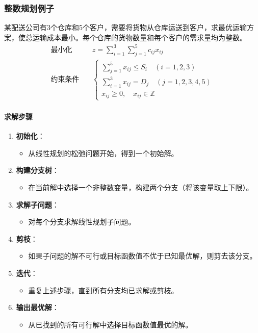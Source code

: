 \documentclass[UTF8]{ctexart}
\begin{document}
\subsubsection {整数规划例子}
某配送公司有3个仓库和5个客户，需要将货物从仓库运送到客户，求最优运输方案，使总运输成本最小。每个仓库的货物数量和每个客户的需求量均为整数。
\[
\begin{aligned}
\text{最小化} & \quad z = \sum_{i=1}^3 \sum_{j=1}^5 c_{ij} x_{ij} \\
\text{约束条件} & \quad 
\begin{cases}
\sum_{j=1}^5 x_{ij} \leq S_i \quad (i=1,2,3) \\
\sum_{i=1}^3 x_{ij} = D_j \quad (j=1,2,3,4,5) \\
x_{ij} \geq 0, \quad x_{ij} \in \mathbb{Z}
\end{cases}
\end{aligned}
\]

\paragraph{求解步骤}
\begin{enumerate}
    \item \textbf{初始化}：
        \begin{itemize}
            \item 从线性规划的松弛问题开始，得到一个初始解。
        \end{itemize}
    \item \textbf{构建分支树}：
        \begin{itemize}
            \item 在当前解中选择一个非整数变量，构建两个分支（将该变量取上下限）。
        \end{itemize}
    \item \textbf{求解子问题}：
        \begin{itemize}
            \item 对每个分支求解线性规划子问题。
        \end{itemize}
    \item \textbf{剪枝}：
        \begin{itemize}
            \item 如果子问题的解不可行或目标函数值不优于已知最优解，则剪去该分支。
        \end{itemize}
    \item \textbf{迭代}：
        \begin{itemize}
            \item 重复上述步骤，直到所有分支均已求解或剪枝。
        \end{itemize}
    \item \textbf{输出最优解}：
        \begin{itemize}
            \item 从已找到的所有可行解中选择目标函数值最优的解。
        \end{itemize}
\end{enumerate}
\end{document}
